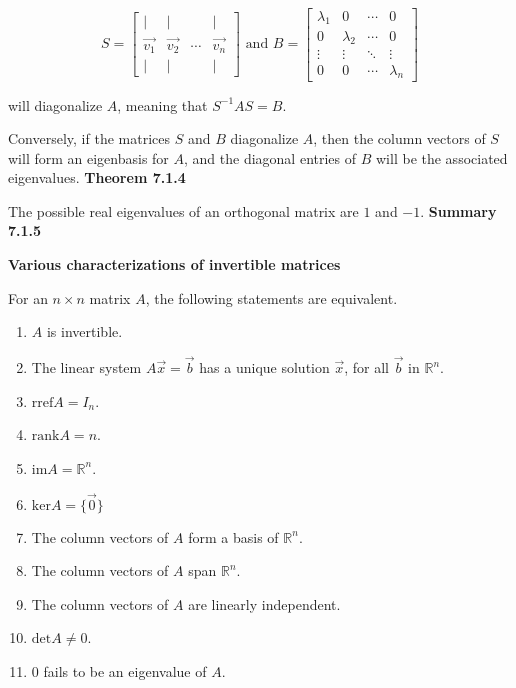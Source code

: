 \[S=\left[\begin{array}{cccc}|&|&&|\\{} \vec{v_{1}}&\vec{v_{2}}&\cdots{}&\vec{v_{n}}\\{} |&|&&|\end{array}\right]\textrm{ and }B=\left[\begin{array}{cccc}\lambda{}_{1}&0&\cdots{}&0\\ 0&\lambda{}_{2}&\cdots{}&0\\ \vdots{}&\vdots{}&\ddots{}&\vdots{}\\ 0&0&\cdots{}&\lambda{}_{n}\end{array}\right]\]
\par\noindent will diagonalize $A$, meaning that $S^{-1}AS=B$.
\par Conversely, if the matrices $S$ and $B$ diagonalize $A$, then the column vectors of $S$ will form an eigenbasis for $A$, and the diagonal entries of $B$ will be the associated eigenvalues.
\textbf{Theorem 7.1.4}\\
\par\noindent The possible real eigenvalues of an orthogonal matrix are $1$ and $-1$.
\textbf{Summary 7.1.5}\\
\par\noindent\textbf{Various characterizations of invertible matrices}
\par\noindent For an $n\times{}n$ matrix $A$, the following statements are equivalent.
\renewcommand{\labelenumi}{\textbf{\roman{enumi}.}}
\begin{enumerate}
\item $A$ is invertible.
\item The linear system $A\vec{x}=\vec{b}$ has a unique solution $\vec{x}$, for all $\vec{b}$ in $\mathbb{R}^{n}$.
\item $\textrm{rref}A=I_{n}$.
\item $\textrm{rank}A=n$.
\item $\textrm{im}A=\mathbb{R}^{n}$.
\item $\textrm{ker}A=\{\vec{0}\}$
\item The column vectors of $A$ form a basis of $\mathbb{R}^{n}$.
\item The column vectors of $A$ span $\mathbb{R}^{n}$.
\item The column vectors of $A$ are linearly independent.
\item $\textrm{det}A\ne{}0$.
\item $0$ fails to be an eigenvalue of $A$.
\end{enumerate}


